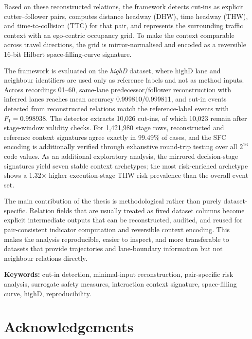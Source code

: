 \documentclass[12pt,a4paper,twoside,openright]{report}
\begin{document}
    Based on these reconstructed relations, the framework detects cut-ins as explicit cutter--follower pairs, computes distance headway (DHW), time headway (THW), and time-to-collision (TTC) for that pair, and represents the surrounding traffic context with an ego-centric occupancy grid. To make the context comparable across travel directions, the grid is mirror-normalised and encoded as a reversible 16-bit Hilbert space-filling-curve signature.

    The framework is evaluated on the \textit{highD} dataset, where highD lane and neighbour identifiers are used only as reference labels and not as method inputs. Across recordings 01--60, same-lane predecessor/follower reconstruction with inferred lanes reaches mean accuracy 0.999810/0.999811, and cut-in events detected from reconstructed relations match the reference-label events with $F_1 = 0.998938$. The detector extracts 10,026 cut-ins, of which 10,023 remain after stage-window validity checks. For 1,421,980 stage rows, reconstructed and reference context signatures agree exactly in 99.49\% of cases, and the SFC encoding is additionally verified through exhaustive round-trip testing over all $2^{16}$ code values. As an additional exploratory analysis, the mirrored decision-stage signatures yield seven stable context archetypes; the most risk-enriched archetype shows a 1.32$\times$ higher execution-stage THW risk prevalence than the overall event set.

    The main contribution of the thesis is methodological rather than purely dataset-specific. Relation fields that are usually treated as fixed dataset columns become explicit intermediate outputs that can be reconstructed, audited, and reused for pair-consistent indicator computation and reversible context encoding. This makes the analysis reproducible, easier to inspect, and more transferable to datasets that provide trajectories and lane-boundary information but not neighbour relations directly.

    \noindent\textbf{Keywords:} cut-in detection, minimal-input reconstruction, pair-specific risk analysis, surrogate safety measures, interaction context signature, space-filling curve, highD, reproducibility.

    \cleardoublepage
    \chapter*{Acknowledgements}
\end{document}
